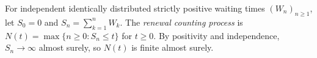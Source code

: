 
For independent identically distributed strictly positive waiting times $(W_n)_{n\ge1}$, let $S_0=0$ and $S_n=\sum_{k=1}^n W_k$. The \emph{renewal counting process} is $N(t)=\max\{n\ge0:S_n\le t\}$ for $t\ge0$. By positivity and independence, $S_n\to\infty$ almost surely, so $N(t)$ is finite almost surely.
